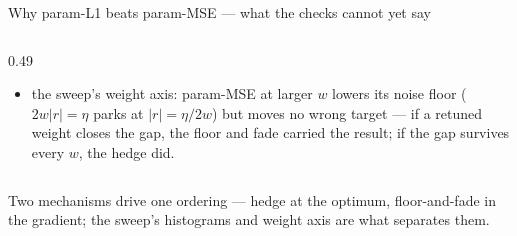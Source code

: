 \begin{frame}{Why param-L1 beats param-MSE --- what the checks cannot yet say}
\begin{columns}[c]
\begin{column}{0.49\textwidth}
\begin{itemize}
\begin{itemize}
        \item {\scriptsize the sweep's weight axis: param-MSE at larger $w$
              lowers its noise floor ($2w|r| = \eta$ parks at
              $|r| = \eta/2w$) but moves no wrong target --- if a retuned
              weight closes the gap, the floor and fade
              carried the result; if the gap survives every $w$, the hedge
              did.}
        \end{itemize}
      \end{itemize}
    \end{column}
  \end{columns}
  \vfill
  {\scriptsize\color{soft} Two mechanisms drive one ordering --- hedge at
  the optimum, floor-and-fade in the gradient; the sweep's histograms and
  weight axis are what separates them.\par}
\end{frame}
